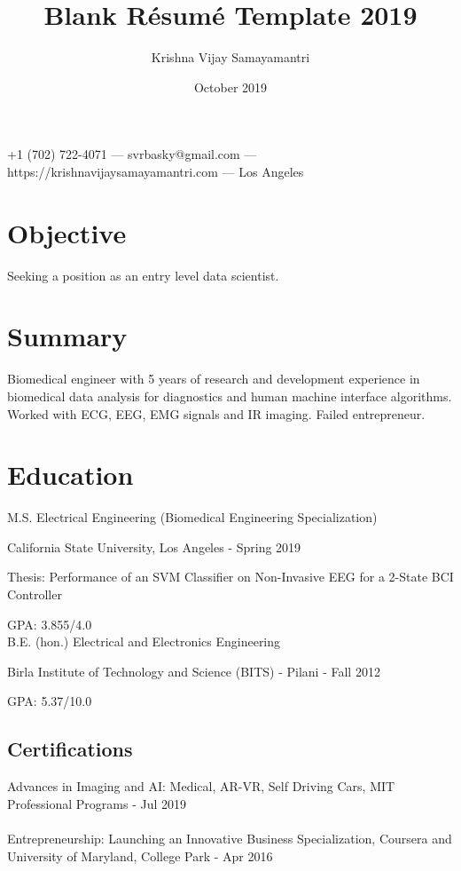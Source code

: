 \documentclass{article}
\makeatletter
\renewcommand{\maketitle}{
\begin{center}
    {\huge\bfseries
    \theauthor}
    
    \vspace{.25em}
    +1 (702) 722-4071 ---
    svrbasky@gmail.com --- https://krishnavijaysamayamantri.com ---
    Los Angeles
    
\end{center}
}
\makeatother
\begin{document}
\title{Blank R\'esum\'e Template 2019}
\author{Krishna Vijay Samayamantri}
\date{October 2019}
\maketitle


\section{Objective}
Seeking a position as an entry level data scientist.

\section{Summary}
Biomedical engineer with 5 years of research and development experience in biomedical data analysis for diagnostics and human machine interface algorithms. Worked with ECG, EEG, EMG signals and IR imaging. Failed entrepreneur.

\section{Education}
M.S. Electrical Engineering (Biomedical Engineering Specialization)

\noindent    
California State University, Los Angeles - Spring 2019

\noindent    
Thesis: Performance of an SVM Classifier on Non-Invasive EEG for a 2-State BCI Controller 

\noindent   
GPA: 3.855/4.0\\

\noindent    
B.E. (hon.) Electrical and Electronics Engineering

\noindent    
Birla Institute of Technology and Science (BITS) - Pilani - Fall 2012

\noindent    
GPA: 5.37/10.0


\subsection{Certifications}
Advances in Imaging and AI: Medical, AR-VR, Self Driving Cars, MIT Professional Programs - Jul 2019\\
\\
Entrepreneurship: Launching an Innovative Business Specialization, Coursera and University of Maryland, College Park - Apr 2016
\end{document}
